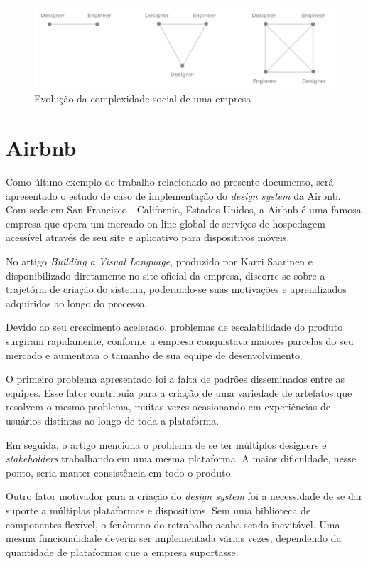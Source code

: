 \begin{figure}
	\includegraphics[width=\linewidth]{./04-figuras/03_trabalhos_relacionados/social-complexity.png}
    \caption{Evolução da complexidade social de uma empresa}
    \label{fig:socialComplexityIncrease}
\end{figure}

\section{Airbnb}
\label{sec:airbnb}

Como último exemplo de trabalho relacionado ao presente documento, será apresentado o estudo de caso de implementação do \textit{design system} da Airbnb. Com sede em San Francisco - California, Estados Unidos, a Airbnb é uma famosa empresa que opera um mercado on-line global de serviços de hospedagem acessível através de seu site e aplicativo para dispositivos móveis.

No artigo \textit{Building a Visual Language}, produzido por Karri Saarinen e disponibilizado diretamente no site oficial da empresa, discorre-se sobre a trajetória de criação do sistema, poderando-se suas motivações e aprendizados adquiridos ao longo do processo.

Devido ao seu crescimento acelerado, problemas de escalabilidade do produto surgiram rapidamente, conforme a empresa conquistava maiores parcelas do seu mercado e aumentava o tamanho de sua equipe de desenvolvimento.

O primeiro problema apresentado foi a falta de padrões disseminados entre as equipes. Esse fator contribuia para a criação de uma variedade de artefatos que resolvem o mesmo problema, muitas vezes ocasionando em experiências de usuários distintas ao longo de toda a plataforma.

Em seguida, o artigo menciona o problema de se ter múltiplos designers e \textit{stakeholders} trabalhando em uma mesma plataforma. A maior dificuldade, nesse ponto, seria manter consistência em todo o produto.

Outro fator motivador para a criação do \textit{design system} foi a necessidade de se dar suporte a múltiplas plataformas e dispositivos. Sem uma biblioteca de componentes flexível, o fenômeno do retrabalho acaba sendo inevitável. Uma mesma funcionalidade deveria ser implementada várias vezes, dependendo da quantidade de plataformas que a empresa suportasse.


